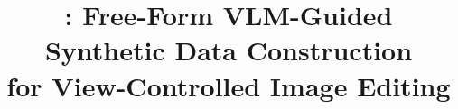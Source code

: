\documentclass{article}
\title{\dataevolver: Free-Form VLM-Guided Synthetic Data Construction\\
       for View-Controlled Image Editing}
\author{
}
\begin{document}
\maketitle

\begin{abstract}

\end{abstract}

















\end{document}
